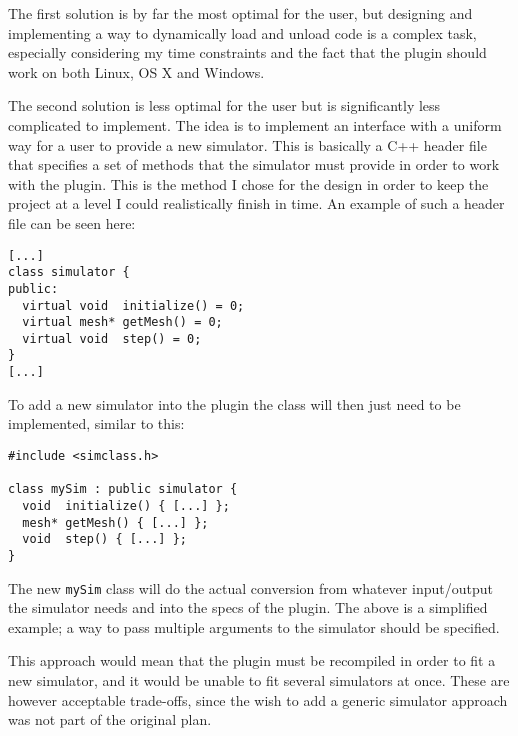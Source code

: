 The first solution is by far the most optimal for the user, but designing and
implementing a way to dynamically load and unload code is a complex task, especially
considering my time constraints and the fact that the plugin should work on both
Linux, OS X and Windows.


The second solution is less optimal for the user but is significantly less
complicated to implement. The idea is to implement an interface with a uniform
way for a user to provide a new simulator. This is basically a C++ header file
that specifies a set of methods that the simulator must provide in order to work
with the plugin. This is the method I chose for the design in order to keep the
project at a level I could realistically finish in time.  An example of such a
header file can be seen here:
\begin{lstlisting}
[...]
class simulator {
public:
  virtual void  initialize() = 0;
  virtual mesh* getMesh() = 0;
  virtual void  step() = 0;
}
[...]
\end{lstlisting}
To add a new simulator into the plugin the class will then just need to be
implemented, similar to this:
\begin{lstlisting}
#include <simclass.h>

class mySim : public simulator {
  void  initialize() { [...] };
  mesh* getMesh() { [...] };
  void  step() { [...] };
}
\end{lstlisting}
The new \texttt{mySim} class will do the actual conversion from whatever
input/output the simulator needs and into the specs of the plugin. The above is
a simplified example; a way to pass multiple arguments to the simulator should
be specified.

This approach would mean that the plugin must be recompiled in order to fit a
new simulator, and it would be unable to fit several simulators at once. These
are however acceptable trade-offs, since the wish to add a generic simulator
approach was not part of the original plan.

